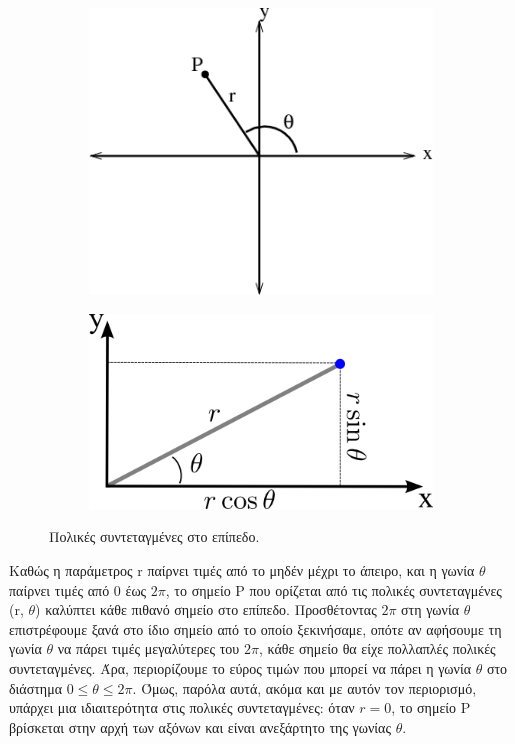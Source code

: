 \begin{figure}[h]
   \centering
\begin{subfigure}[h]{0.45\textwidth}
	\centering
   	 \includegraphics[width = \linewidth]{Figures/appendixA_polar_coordinates_whole.png} 
\end{subfigure}
\begin{subfigure}[h]{0.4\textwidth}
	\centering
	\includegraphics[width = \linewidth]{Figures/appendixA_polar_coordinates.png} 
    \end{subfigure}
    \caption{Πολικές συντεταγμένες στο επίπεδο.}
    \label{fig:apxA_polar_coordinates}
\end{figure}

Καθώς η παράμετρος r παίρνει τιμές από το μηδέν μέχρι το άπειρο, και η γωνία $\theta$ παίρνει τιμές από 0 έως $2\pi$, το σημείο P που ορίζεται από τις πολικές συντεταγμένες (r, $\theta$) καλύπτει κάθε πιθανό σημείο στο επίπεδο. Προσθέτοντας $2\pi$ στη γωνία $\theta$ επιστρέφουμε ξανά στο ίδιο σημείο από το οποίο ξεκινήσαμε, οπότε αν αφήσουμε τη γωνία $\theta$ να πάρει τιμές μεγαλύτερες του $2\pi$, κάθε σημείο θα είχε πολλαπλές πολικές συντεταγμένες. Άρα, περιορίζουμε το εύρος τιμών που μπορεί να πάρει η γωνία $\theta$ στο διάστημα $0 \leq \theta \leq 2\pi$. Όμως, παρόλα αυτά, ακόμα και με αυτόν τον περιορισμό, υπάρχει μια ιδιαιτερότητα στις πολικές συντεταγμένες: όταν $r=0$, το σημείο P βρίσκεται στην αρχή των αξόνων και είναι ανεξάρτητο της γωνίας $\theta$.

